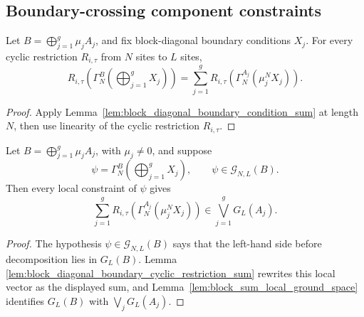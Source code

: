 \subsection{Boundary-crossing component constraints}\label{subsec:block_diagonal_boundary_crossing}

\begin{lemma}
    \label{lem:block_diagonal_boundary_cyclic_restriction_sum}
    \leanok
    Let \(B=\bigoplus_{j=1}^g\mu_jA_j\), and fix block-diagonal boundary
    conditions \(X_j\). For every cyclic restriction \(R_{i,\tau}\) from
    \(N\) sites to \(L\) sites,
    \[
        R_{i,\tau}\!\left(
        \Gamma_N^B\!\left(\bigoplus_{j=1}^gX_j\right)
        \right)
        =
        \sum_{j=1}^g
        R_{i,\tau}\!\left(\Gamma_N^{A_j}(\mu_j^NX_j)\right).
    \]
\end{lemma}

\begin{proof}
    \leanok
    Apply Lemma~\ref{lem:block_diagonal_boundary_condition_sum} at length \(N\),
    then use linearity of the cyclic restriction \(R_{i,\tau}\).
\end{proof}

\begin{lemma}
    \label{lem:block_diagonal_boundary_local_sum_mem}
    \leanok
    Let \(B=\bigoplus_{j=1}^g\mu_jA_j\), with \(\mu_j\ne0\), and suppose
    \[
        \psi=\Gamma_N^B\!\left(\bigoplus_{j=1}^gX_j\right),
        \qquad
        \psi\in\mathcal G_{N,L}(B).
    \]
    Then every local constraint of \(\psi\) gives
    \[
        \sum_{j=1}^g
        R_{i,\tau}\!\left(\Gamma_N^{A_j}(\mu_j^NX_j)\right)
        \in
        \bigvee_{j=1}^gG_L(A_j).
    \]
\end{lemma}

\begin{proof}
    \leanok
    The hypothesis \(\psi\in\mathcal G_{N,L}(B)\) says that the left-hand side
    before decomposition lies in \(G_L(B)\).  Lemma
    \ref{lem:block_diagonal_boundary_cyclic_restriction_sum} rewrites this local
    vector as the displayed sum, and Lemma~\ref{lem:block_sum_local_ground_space}
    identifies \(G_L(B)\) with \(\bigvee_jG_L(A_j)\).

\end{proof}

